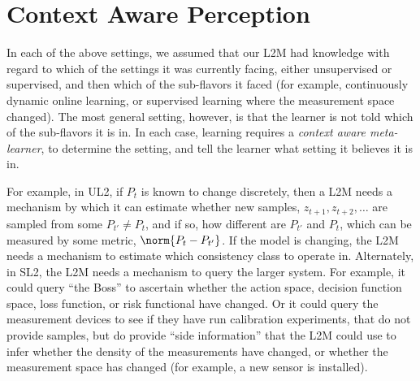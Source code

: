 \documentclass{article}
\begin{document}




\section{Context Aware Perception}
\label{sec:perception}




In each of the above settings, we assumed that our L2M had  knowledge with regard to which of the  settings it was currently facing, either unsupervised or supervised, and then which of the sub-flavors it faced (for example, continuously dynamic online learning, or supervised learning where the measurement space changed).  The most general setting, however, is that the learner is not told which of the sub-flavors it is in.  In each case, learning requires a \emph{context aware meta-learner}, to determine the setting, and tell the learner what setting it believes it is in. 

For example, in UL2,  if $P_t$ is known to change discretely, then a L2M needs a mechanism by which it can estimate whether  new samples, $z_{t+1}, z_{t+2},\ldots$ are sampled from some $P_{t'} \neq P_t$, and if so, how different are $P_{t'}$ and $P_t$, which can be measured by some metric, $\norm{P_t - P_{t'}}$.  If the model is changing, the L2M needs a mechanism to estimate which consistency class to operate in. Alternately, in SL2, the L2M needs a mechanism to query the larger system.  For example, it could query ``the Boss'' to ascertain whether the action space, decision function space, loss function, or risk functional have changed.  Or it could query the measurement devices to see if they have run calibration experiments, that do not provide samples, but do provide ``side information'' that the L2M could use to infer whether the density of the measurements have changed, or whether the measurement space has changed (for example, a new sensor is installed).  
\end{document}
